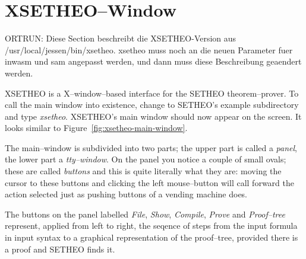 \section{XSETHEO--Window}\label{sec:xsetheo}

ORTRUN: Diese Section beschreibt die XSETHEO-Version aus
/usr/local/jessen/bin/xsetheo. xsetheo muss noch an die neuen
Parameter fuer inwasm und sam angepasst werden, und dann muss diese
Beschreibung geaendert werden.

XSETHEO is a X--window--based interface for the SETHEO
theorem--prover. To call the main window into existence, change to
SETHEO's example subdirectory and type {\it xsetheo\/}. XSETHEO's main
window should now appear on the screen. It looks similar to
Figure~\ref{fig:xsetheo-main-window}. 
%


The main--window is subdivided into two parts; the upper part is
called a {\it panel\/}, the lower part a {\it tty--window\/}. On the
panel you notice a couple of small ovals; these are called {\it
buttons\/} and this is quite literally what they are: moving the
cursor to these buttons and clicking the left mouse--button will call
forward the action selected just as pushing buttons of a vending
machine does.  

The buttons on the panel labelled {\it File\/}, {\it Show\/}, {\it
Compile\/}, {\it Prove\/} and {\it Proof--tree\/} represent, applied
from left to right, the seqence of steps from the input formula in
input syntax to a graphical representation of the proof--tree,
provided  there is a proof and SETHEO finds it.  


